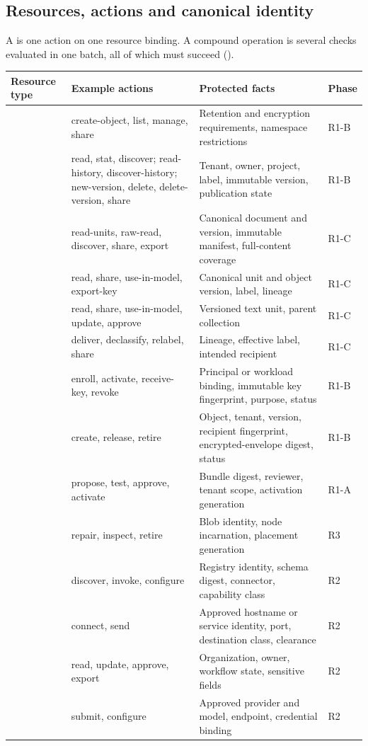 \subsection{Resources, actions and canonical identity}
A  is one action on one resource binding. A compound operation is several checks evaluated in one batch, all of which must succeed ().
\begin{longtable}{@{}P{0.25\textwidth}P{0.25\textwidth}P{0.31\textwidth}P{0.08\textwidth}@{}}
\toprule Resource type & Example actions & Protected facts & Phase\\\midrule\endhead
{} & create-object, list, manage, share & Retention and encryption requirements, namespace restrictions & R1-B\\
 & read, stat, discover; read-history, discover-history; new-version, delete, delete-version, share & Tenant, owner, project, label, immutable version, publication state & R1-B\\
 & read-units, raw-read, discover, share, export & Canonical document and version, immutable manifest, full-content coverage & R1-C\\
 & read, share, use-in-model, export-key & Canonical unit and object version, label, lineage & R1-C\\
 & read, share, use-in-model, update, approve & Versioned text unit, parent collection & R1-C\\
 & deliver, declassify, relabel, share & Lineage, effective label, intended recipient & R1-C\\
 & enroll, activate, receive-key, revoke & Principal or workload binding, immutable key fingerprint, purpose, status & R1-B\\
 & create, release, retire & Object, tenant, version, recipient fingerprint, encrypted-envelope digest, status & R1-B\\
 & propose, test, approve, activate & Bundle digest, reviewer, tenant scope, activation generation & R1-A\\
 & repair, inspect, retire & Blob identity, node incarnation, placement generation & R3\\
 & discover, invoke, configure & Registry identity, schema digest, connector, capability class & R2\\
 & connect, send & Approved hostname or service identity, port, destination class, clearance & R2\\
 & read, update, approve, export & Organization, owner, workflow state, sensitive fields & R2\\
 & submit, configure & Approved provider and model, endpoint, credential binding & R2\\
\bottomrule
\end{longtable}
